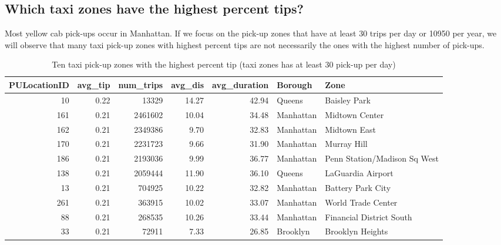 \documentclass[12pt,twoside]{reedthesis}
\newenvironment{Shaded}{\begin{snugshade}}{\end{snugshade}}
\newcommand{\KeywordTok}[1]{\textcolor[rgb]{0.13,0.29,0.53}{\textbf{#1}}}
\newcommand{\DecValTok}[1]{\textcolor[rgb]{0.00,0.00,0.81}{#1}}
\newcommand{\StringTok}[1]{\textcolor[rgb]{0.31,0.60,0.02}{#1}}
\newcommand{\CommentTok}[1]{\textcolor[rgb]{0.56,0.35,0.01}{\textit{#1}}}
\newcommand{\OperatorTok}[1]{\textcolor[rgb]{0.81,0.36,0.00}{\textbf{#1}}}
\newcommand{\NormalTok}[1]{#1}
\theoremstyle{definition}
\theoremstyle{definition}
\theoremstyle{definition}
\theoremstyle{remark}
\begin{document}
\subsection{Which taxi zones have the highest percent
tips?}\label{which-taxi-zones-have-the-highest-percent-tips}

Most yellow cab pick-ups occur in Manhattan. If we focus on the pick-up
zones that have at least 30 trips per day or 10950 per year, we will
observe that many taxi pick-up zones with highest percent tips are not
necessarily the ones with the highest number of pick-ups.
\begin{Shaded}
\end{Shaded}
\begin{table}

\caption{\label{tab:unnamed-chunk-34}Ten taxi pick-up zones with the highest percent tip (taxi zones has at least 30 pick-up per day)}
\centering
\begin{tabular}[t]{r|r|r|r|r|l|l}
\hline
PULocationID & avg\_tip & num\_trips & avg\_dis & avg\_duration & Borough & Zone\\
\hline
10 & 0.22 & 13329 & 14.27 & 42.94 & Queens & Baisley Park\\
\hline
161 & 0.21 & 2461602 & 10.04 & 34.48 & Manhattan & Midtown Center\\
\hline
162 & 0.21 & 2349386 & 9.70 & 32.83 & Manhattan & Midtown East\\
\hline
170 & 0.21 & 2231723 & 9.66 & 31.90 & Manhattan & Murray Hill\\
\hline
186 & 0.21 & 2193036 & 9.99 & 36.77 & Manhattan & Penn Station/Madison Sq West\\
\hline
138 & 0.21 & 2059444 & 11.90 & 36.10 & Queens & LaGuardia Airport\\
\hline
13 & 0.21 & 704925 & 10.22 & 32.82 & Manhattan & Battery Park City\\
\hline
261 & 0.21 & 363915 & 10.02 & 33.07 & Manhattan & World Trade Center\\
\hline
88 & 0.21 & 268535 & 10.26 & 33.44 & Manhattan & Financial District South\\
\hline
33 & 0.21 & 72911 & 7.33 & 26.85 & Brooklyn & Brooklyn Heights\\
\hline
\end{tabular}
\end{table}
\end{document}
